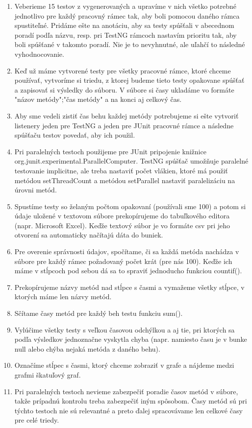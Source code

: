 \documentclass[11pt,twoside,slovak,a4paper]{article}
\begin{document}
\begin{enumerate}
 		\item Veberieme 15 testov z vygenerovaných a upravíme v nich všetko potrebné jednotlivo pre každý pracovný rámec tak, aby boli pomocou daného rámca spustiteľné. Pridáme ešte na anotáciu, aby sa testy spúšťali v abecednom poradí podľa názvu, resp. pri TestNG rámcoch nastavím prioritu tak, aby boli spúšťané v takomto poradí. Nie je to nevyhnutné, ale uľahčí to následné vyhodnocovanie.
 		\item Keď už máme vytvorené testy pre všetky pracovné rámce, ktoré chceme používať, vytvoríme si triedu, z ktorej budeme tieto testy opakovane spúšťať a zapisovať si výsledky do súboru. V súbore si časy ukladáme vo formáte "názov metódy";"čas metódy" a na konci aj celkový čas.
 		\item Aby sme vedeli zistiť čas behu každej metódy potrebujeme si ešte vytvoriť listenery jeden pre TestNG a jeden pre JUnit pracovné rámce a následne spúšťaču testov povedať, aby ich použil.
 		\item Pri paralelných testoch použijeme pre JUnit pripojenie knižnice org.junit.experimental.ParallelComputer. TestNG spúšťač umožňuje paralelné testovanie implicitne, ale treba nastaviť počet vlákien, ktoré má použiť metódou setThreadCount a metódou setParallel nastaviť paralelizáciu na úrovni metód.
 		\item Spustíme testy so želaným počtom opakovaní (používali sme 100) a potom si údaje uložené v textovom súbore prekopírujeme do tabuľkového editora (napr. Microsoft Excel). Keďže textový súbor je vo formáte csv pri jeho otvorení sa automaticky načítajú dáta do buniek.
 		\item Pre overenie správnosti údajov, spočítame, či sa každá metóda nachádza v súbore pre každý rámec požadovaný počet krát (pre nás 100). Keďže ich máme v stĺpcoch pod sebou dá sa to spraviť jednoducho funkciou countif(). 
 		\item Prekopírujeme názvy metód nad stĺpce s časmi a vymažeme všetky stĺpce, v ktorých máme len názvy metód. 
 		\item Sčítame časy metód pre každý beh testu funkciu sum().
 		\item Vylúčime všetky testy s veľkou časovou odchýlkou a aj tie, pri ktorých sa podľa výsledkov jednoznačne vyskytla chyba (napr. namiesto času je v bunke null alebo chýba nejaká metóda z daného behu).
 		\item Označíme stĺpec s časmi, ktorý chceme zobraziť v grafe a nájdeme medzi grafmi škatuľový graf.
 		\item Pri paralelných testoch nevieme zabezpečiť poradie časov metód v súbore, takže prípadnú kontrolu treba zabezpečiť iným spôsobom. Časy metód sú pri týchto testoch nie sú relevantné a preto ďalej spracovávame len celkové časy pre celé triedy. 
 	\end{enumerate}
 	
\end{document}
